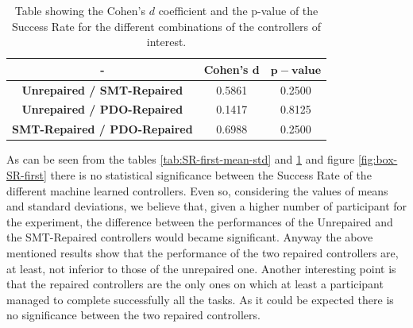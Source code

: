 \begin{table}[ht]
    \centering
    \begin{tabular}{|c|c|c|}
        \hline
        - & \textbf{Cohen's} $\mathbf{d}$ & $\mathbf{p-value}$ \\
        \hline
        \textbf{Unrepaired / SMT-Repaired} & 0.5861 & 0.2500 \\
        \textbf{Unrepaired / PDO-Repaired} & 0.1417 & 0.8125 \\
        \textbf{SMT-Repaired / PDO-Repaired} & 0.6988 & 0.2500 \\
        \hline
    \end{tabular}
    \caption{Table showing the Cohen's $d$ coefficient and the p-value of the Success Rate for the different combinations of the controllers of interest.}
    \label{tab:SR-first-cohen-p}
\end{table}
As can be seen from the tables \ref{tab:SR-first-mean-std} and \ref{tab:SR-first-cohen-p} and figure \ref{fig:box-SR-first} there is no statistical significance between the Success Rate of the different machine learned controllers. Even so, considering the values of means and standard deviations, we believe that, given a higher number of participant for the experiment, the difference between the performances of the Unrepaired and the SMT-Repaired controllers would became significant. Anyway the above mentioned results show that the performance of the two repaired controllers are, at least, not inferior to those of the unrepaired one. Another interesting point is that the repaired controllers are the only ones on which at least a participant managed to complete successfully all the tasks. As it could be expected there is no significance between the two repaired controllers.
%
%
%
%
%
